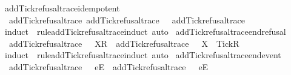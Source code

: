 \begin{isabellebody}
\isanewline
{}\isamarkupfalse%
\ add{\isacharunderscore}Tick{\isacharunderscore}refusal{\isacharunderscore}trace{\isacharunderscore}idempotent{\isacharcolon}\isanewline
\ \ {\isachardoublequoteopen}add{\isacharunderscore}Tick{\isacharunderscore}refusal{\isacharunderscore}trace\ {\isacharparenleft}add{\isacharunderscore}Tick{\isacharunderscore}refusal{\isacharunderscore}trace\ {\isasymrho}{\isacharparenright}\ {\isacharequal}\ add{\isacharunderscore}Tick{\isacharunderscore}refusal{\isacharunderscore}trace\ {\isasymrho}{\isachardoublequoteclose}\isanewline
%
\isadelimproof
\ \ %
\endisadelimproof
%
\isatagproof
{}\isamarkupfalse%
\ {\isacharparenleft}induct\ {\isasymrho}\ rule{\isacharcolon}add{\isacharunderscore}Tick{\isacharunderscore}refusal{\isacharunderscore}trace{\isachardot}induct{\isacharcomma}\ auto{\isacharparenright}%
\endisatagproof
{\isafoldproof}%
%
\isadelimproof
\isanewline
%
\endisadelimproof
\isanewline
{}\isamarkupfalse%
\ add{\isacharunderscore}Tick{\isacharunderscore}refusal{\isacharunderscore}trace{\isacharunderscore}end{\isacharunderscore}refusal{\isacharcolon}\isanewline
\ \ {\isachardoublequoteopen}add{\isacharunderscore}Tick{\isacharunderscore}refusal{\isacharunderscore}trace\ {\isacharparenleft}{\isasymrho}\ {\isacharat}\ {\isacharbrackleft}{\isacharbrackleft}X{\isacharbrackright}\isactrlsub R{\isacharbrackright}{\isacharparenright}\ {\isacharequal}\ add{\isacharunderscore}Tick{\isacharunderscore}refusal{\isacharunderscore}trace\ {\isasymrho}\ {\isacharat}\ {\isacharbrackleft}{\isacharbrackleft}X\ {\isasymunion}\ {\isacharbraceleft}Tick{\isacharbraceright}{\isacharbrackright}\isactrlsub R{\isacharbrackright}{\isachardoublequoteclose}\isanewline
%
\isadelimproof
\ \ %
\endisadelimproof
%
\isatagproof
{}\isamarkupfalse%
\ {\isacharparenleft}induct\ {\isasymrho}\ rule{\isacharcolon}add{\isacharunderscore}Tick{\isacharunderscore}refusal{\isacharunderscore}trace{\isachardot}induct{\isacharcomma}\ auto{\isacharparenright}%
\endisatagproof
{\isafoldproof}%
%
\isadelimproof
\isanewline
%
\endisadelimproof
\isanewline
{}\isamarkupfalse%
\ add{\isacharunderscore}Tick{\isacharunderscore}refusal{\isacharunderscore}trace{\isacharunderscore}end{\isacharunderscore}event{\isacharcolon}\isanewline
\ \ {\isachardoublequoteopen}add{\isacharunderscore}Tick{\isacharunderscore}refusal{\isacharunderscore}trace\ {\isacharparenleft}{\isasymrho}\ {\isacharat}\ {\isacharbrackleft}{\isacharbrackleft}e{\isacharbrackright}\isactrlsub E{\isacharbrackright}{\isacharparenright}\ {\isacharequal}\ add{\isacharunderscore}Tick{\isacharunderscore}refusal{\isacharunderscore}trace\ {\isasymrho}\ {\isacharat}\ {\isacharbrackleft}{\isacharbrackleft}e{\isacharbrackright}\isactrlsub E{\isacharbrackright}{\isachardoublequoteclose}\isanewline

\end{isabellebody}
